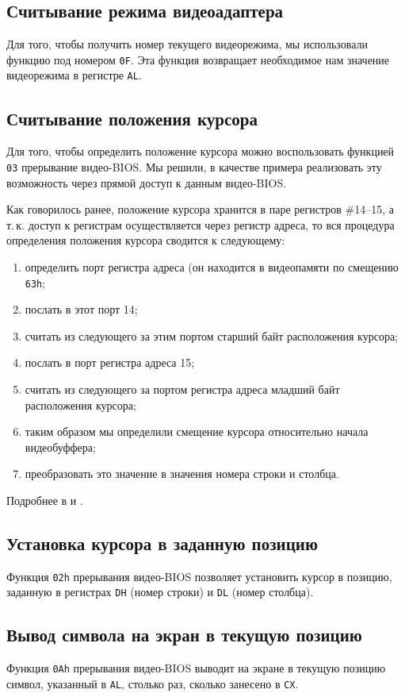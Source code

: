 \documentclass[a4paper,12pt,notitlepage,pdftex,headsepline]{scrartcl}
\begin{document}
\subsection{Считывание режима видеоадаптера}
Для того, чтобы получить номер текущего видеорежима, мы использовали функцию под номером \texttt{0F}.
Эта функция возвращает необходимое нам значение видеорежима в регистре \texttt{AL}.
\subsection{Считывание положения курсора}
Для того, чтобы определить положение курсора можно воспользовать функцией \texttt{03} прерывание видео-BIOS.
Мы решили, в качестве примера реализовать эту возможность через прямой доступ к данным видео-BIOS.

Как говорилось ранее, положение курсора хранится в паре регистров \#14--15, а т.\,к. доступ к регистрам осуществляется через регистр адреса, то вся процедура определения положения курсора сводится к следующему:
\begin{enumerate}
\item определить порт регистра адреса (он находится в видеопамяти по смещению \texttt{63h};
\item послать в этот порт 14;
\item считать из следующего за этим портом старший байт расположения курсора;
\item послать в порт регистра адреса 15;
\item считать из следующего за портом регистра адреса младший байт расположения курсора;
\item таким образом мы определили смещение курсора относительно начала видеобуффера;
\item преобразовать это значение в значения номера строки и столбца.
\end{enumerate}
Подробнее в \cite{random2} и \cite{cyberguru}.
\subsection{Установка курсора в заданную позицию}
Функция \texttt{02h} прерывания видео-BIOS позволяет установить курсор в позицию, заданную в регистрах \texttt{DH} (номер строки) и \texttt{DL} (номер столбца).
\subsection{Вывод символа на экран в текущую позицию}
Функция \texttt{0Ah} прерывания видео-BIOS выводит на экране в текущую позицию символ, указанный в \texttt{AL}, столько раз, сколько занесено в \texttt{CX}.
\end{document}
